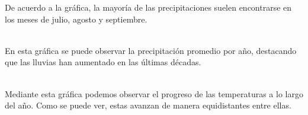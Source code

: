 \documentclass[letterpaper,12pt]{article}
\begin{document}
\begin{figure}[H]
\centering
{}
\label{fig:esquema1}
\end{figure}
De acuerdo a la gráfica, la mayoría de las precipitaciones suelen encontrarse en los meses de julio, agosto y septiembre.
\\
\\
\begin{figure}[H]
\centering
{}
\label{fig:esquema2}
\end{figure}
En esta gráfica se puede observar la precipitación promedio por año, destacando que las lluvias han aumentado en las últimas décadas.
\\
\\
\begin{figure}[H]
\centering
{}
\label{fig:esquema3}
\end{figure}
Mediante esta gráfica podemos observar el progreso de las temperaturas a lo largo del año. Como se puede ver, estas avanzan de manera equidistantes entre ellas. 
\\
\end{document}
